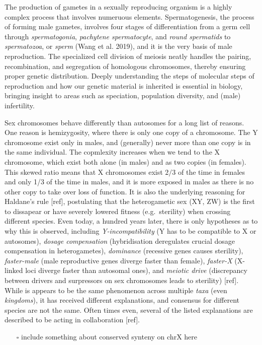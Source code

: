 \documentclass[
  11pt,
  a4paper,
]{scrbook}
\providecommand{\tightlist}{%
  \setlength{\itemsep}{0pt}\setlength{\parskip}{0pt}}\usepackage{longtable,booktabs,array}
\let\oldemph\emph
\renewcommand\emph[1]{\oldemph{\color{gray}#1}}
\begin{document}
The production of gametes in a sexually reproducing organism is a highly
complex process that involves numeruous elements. Spermatogenesis, the
process of forming male gametes, involves four stages of differentiation
from a germ cell through \emph{spermatogonia}, \emph{pachytene
spermatocyte}, and \emph{round spermatids} to \emph{spermatozoa}, or
\emph{sperm} (Wang et al. 2019), and it is the very basis of male
reproduction. The specialized cell division of meiosis neatly handles
the pairing, recombination, and segregation of homologous chromosomes,
thereby ensuring proper genetic distribution. Deeply understanding the
steps of molecular steps of reproduction and how our genetic material is
inherited is essential in biology, bringing insight to areas such as
speciation, population diversity, and (male) infertility.

Sex chromosomes behave differently than autosomes for a long list of
reasons. One reason is hemizygosity, where there is only one copy of a
chromosome. The Y chromosome exist only in males, and (generally) never
more than one copy is in the same individual. The copmlexity increases
when we tend to the X chromosome, which exist both alone (in males) and
as two copies (in females). This skewed ratio means that X chromosomes
exist \(2/3\) of the time in females and only 1/3 of the time in males,
and it is more exposed in males as there is no other copy to take over
loss of function. It is also the underlying reasoning for Haldane's rule
{[}ref{]}, postulating that the heterogametic sex (XY, ZW) is the first
to dissapear or have severely lowered fitness (e.g.~sterility) when
crossing different species. Even today, a hundred years later, there is
only hypotheses as to why this is observed, including
\emph{Y-incompatibility} (Y has to be compatible to X or autosomes),
\emph{dosage compensation} (hybridisation deregulates crucial dosage
compensation in heterogametes), \emph{dominance} (recessive genes causes
sterility), \emph{faster-male} (male reproductive genes diverge faster
than female), \emph{faster-X} (X-linked loci diverge faster than
autosomal ones), and \emph{meiotic drive} (discrepancy between drivers
and surpressors on sex chromosomes leads to sterility) {[}ref{]}. While
is appears to be the same phenomenon across multiple \emph{taxa} (even
\emph{kingdoms}), it has received different explanations, and consensus
for different species are not the same. Often times even, several of the
listed explanations are described to be acting in collaboration
{[}ref{]}.

\begin{itemize}
\tightlist
\item[$\square$]
  include something about conserved synteny on chrX here
\end{itemize}
\end{document}
